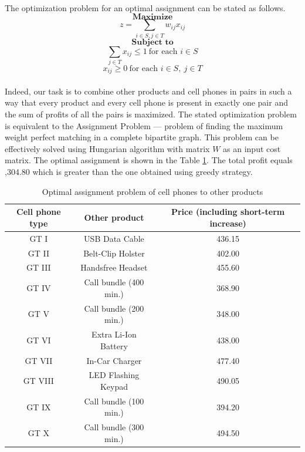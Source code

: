 \begin{enumerate}[(a)]
	\paragraph{}
	The optimization problem for an optimal assignment can be stated as follows.
$$
	\textbf{Maximize}
$$
$$
	z = \sum\limits_{i\in S, j\in T} w_{ij}x_{ij}
$$
$$
	\textbf{Subject to}
$$
$$
	\sum\limits_{j\in T} x_{ij} \leq 1 \ \text{for each }i\in S
$$
$$
	x_{ij} \geq 0 \ \text{for each }i\in S,\  j\in T
$$

	\paragraph{}
	Indeed, our task is to combine other products and cell phones in pairs in such a way that every product and every cell phone is present in exactly one pair and the sum of profits of all the pairs is maximized. The stated optimization problem is equivalent to the Assignment Problem --- problem of finding the maximum weight perfect matching in a complete bipartite graph. This problem can be effectively solved using Hungarian algorithm with matrix $W$ as an input cost matrix. The optimal assignment is shown in the Table \ref{hungarian-5-c}. The total profit equals ,304.80 which is greater than the one obtained using greedy strategy.

\begin{table}[H]
	\centering
	\caption{Optimal assignment problem of cell phones to other products}
	\begin{tabular}{|c|c|c|}\hline
Cell phone type & Other product & Price (including short-term increase) \\ \hline
GT I & USB Data Cable & 436.15 \\
GT II & Belt-Clip Holster & 402.00 \\
GT III & Handsfree Headset & 455.60 \\
GT IV & Call bundle (400 min.) & 368.90 \\
GT V & Call bundle (200 min.) & 348.00 \\
GT VI & Extra Li-Ion Battery & 438.00 \\
GT VII & In-Car Charger & 477.40 \\
GT VIII & LED Flashing Keypad & 490.05 \\
GT IX & Call bundle (100 min.) & 394.20 \\
GT X & Call bundle (300 min.) & 494.50 \\
\hline
	\end{tabular}
	\label{hungarian-5-c}
\end{table}


\end{enumerate}
